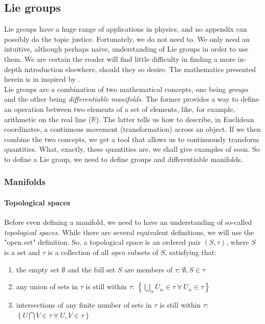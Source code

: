 \documentclass[10pt,twoside]{report}
\begin{document}
	\newpage
	\begin{appendices}
	\chapter{Lie groups}\label{Appendic A | Lie groups}
	Lie groups have a huge range of applications in physics, and no appendix can possibly do the topic justice. Fortunately, we do not need to. We only need an intuitive, although perhaps naive, understanding of Lie groups in order to use them. We are certain the reader will find little difficulty in finding a more in-depth introduction elsewhere, should they so desire. The mathematics presented herein is in inspired by \cite{Nakahara}.\\
	
	Lie groups are a combination of two mathematical concepts, one being \emph{groups} and the other being \emph{differentiable manifolds}. The former provides a way to define an operation between two elements of a set of elements, like, for example, arithmetic on the real line ($\mathbb{R}$). The latter tells us how to describe, in Euclidean coordinates, a continuous movement (transformation) across an object. If we then combine the two concepts, we get a tool that allows us to continuously transform quantities. What, exactly, these quantities are, we shall give examples of soon. So to define a Lie group, we need to define groups and differentiable manifolds.
	
	\subsection{Manifolds}
	\subsubsection{Topological spaces}
	Before even defining a manifold, we need to have an understanding of so-called \emph{topological spaces}. While there are several equivalent definitions, we will use the "open set" definition. So, a topological space is an ordered pair $(S,\tau)$, where $S$ is a set and $\tau$ is a collection of all \emph{open} subsets of $S$, satisfying that:
	
	\begin{enumerate}
		\item the empty set $\emptyset$ and the full set $S$ are members of $\tau$: $\emptyset, S\in \tau$
		\item any union of sets in $\tau$ is still within $\tau$: $\left\{\bigcup_\alpha U_\alpha\in\tau\: \forall \:U_\alpha\in\tau\right\}$ 
		\item intersections of any finite number of sets in $\tau$ is still within $\tau$: $\left\{U\bigcap V\in\tau\: \forall \:U,V\in\tau\right\}$ 
	\end{enumerate}
	

\end{appendices}
\end{document}

